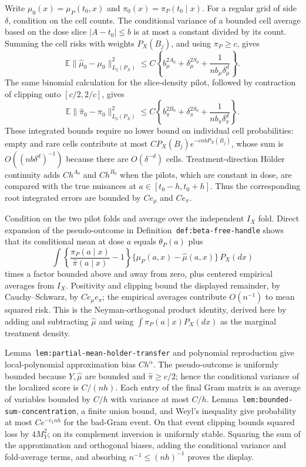 Write \(\mu_0(x)=\mu_P(t_0,x)\) and \(\pi_0(x)=\pi_P(t_0\mid x)\). For a regular grid of side \(\delta\), condition on the cell counts. The conditional variance of a bounded cell average based on the dose slice \(\lvert A-t_0\rvert\le b\) is at most a constant divided by its count. Summing the cell risks with weights \(P_X(B_j)\), and using \(\pi_P\ge c\), gives
\[
\mathbb E\lVert\widehat\mu_0-\mu_0\rVert_{L_2(P_X)}^2
\le C\left\{b_\mu^{2A_0}+\delta_\mu^{2S_0}+\frac1{nb_\mu\delta_\mu^d}\right\}.
\]
The same binomial calculation for the slice-density pilot, followed by contraction of clipping onto \([c/2,2/c]\), gives
\[
\mathbb E\lVert\widehat\pi_0-\pi_0\rVert_{L_2(P_X)}^2
\le C\left\{b_\pi^{2B_0}+\delta_\pi^{2S_0}+\frac1{nb_\pi\delta_\pi^d}\right\}.
\]
These integrated bounds require no lower bound on individual cell probabilities: empty and rare cells contribute at most \(C P_X(B_j)e^{-cnbP_X(B_j)}\), whose sum is \(O((nb\delta^d)^{-1})\) because there are \(O(\delta^{-d})\) cells. Treatment-direction H\"older continuity adds \(Ch^{A_0}\) and \(Ch^{B_0}\) when the pilots, which are constant in dose, are compared with the true nuisances at \(a\in[t_0-h,t_0+h]\). Thus the corresponding root integrated errors are bounded by \(Ce_\mu\) and \(Ce_\pi\).

Condition on the two pilot folds and average over the independent \(I_X\) fold. Direct expansion of the pseudo-outcome in Definition~\texttt{def:beta-free-handle} shows that its conditional mean at dose \(a\) equals \(\theta_P(a)\) plus
\[
\int\left\{\frac{\pi_P(a\mid x)}{\widehat\pi(a\mid x)}-1\right\}\{\mu_P(a,x)-\widehat\mu(a,x)\}\,P_X(dx)
\]
times a factor bounded above and away from zero, plus centered empirical averages from \(I_X\). Positivity and clipping bound the displayed remainder, by Cauchy--Schwarz, by \(Ce_\mu e_\pi\); the empirical averages contribute \(O(n^{-1})\) to mean squared risk. This is the Neyman-orthogonal product identity, derived here by adding and subtracting \(\widehat\mu\) and using \(\int\pi_P(a\mid x)P_X(dx)\) as the marginal treatment density.

Lemma~\texttt{lem:partial-mean-holder-transfer} and polynomial reproduction give local-polynomial approximation bias \(Ch^\alpha\). The pseudo-outcome is uniformly bounded because \(Y,\widehat\mu\) are bounded and \(\widehat\pi\ge c/2\); hence the conditional variance of the localized score is \(C/(nh)\). Each entry of the final Gram matrix is an average of variables bounded by \(C/h\) with variance at most \(C/h\). Lemma~\texttt{lem:bounded-sum-concentration}, a finite union bound, and Weyl's inequality give probability at most \(C e^{-c_1nh}\) for the bad-Gram event. On that event clipping bounds squared loss by \(4M_Y^2\); on its complement inversion is uniformly stable. Squaring the sum of the approximation and orthogonal biases, adding the conditional variance and fold-average terms, and absorbing \(n^{-1}\le(nh)^{-1}\) proves the display.